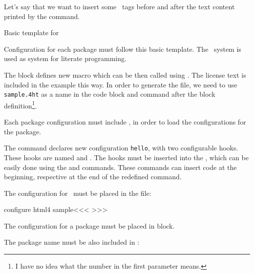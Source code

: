 Let's say that we want to insert some \HTML\ tags before and after the text content printed by the command.

Basic template for 


Configuration for each package must follow this basic template. The \ProTeX\ system is used as system for literate programming.

The  block defines new macro which can be then called using . The license text
is included in the example this way. In order to generate the  file, we need to use \texttt{sample.4ht} as a name
in the code block and command  after the block definition\footnote{I have no idea what the number
in the first parameter means.}.

Each package configuration  must include , in order to load the configurations for the package.

The command  declares new configuration \texttt{hello}, with two configurable hooks. 
These hooks are named   and . The hooks must be inserted into the 
\texcommand{\hello}, which can be easily done using the  and  commands. These
commands can insert code  at the beginning, respective at the end of the redefined command.

The configuration for \HTML\ must be placed in the  file:


\begin{texsource}
\<configure html4 sample\><<<
>>>
\end{texsource}

The configuration for a package must be placed in  block.


The package name must be also included in :


